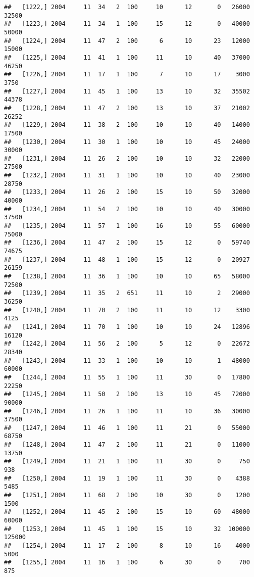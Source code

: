 \documentclass{article}\usepackage[]{graphicx}\usepackage[]{color}
\makeatletter
\newenvironment{kframe}{%
 \def\at@end@of@kframe{}%
 \ifinner\ifhmode%
  \def\at@end@of@kframe{\end{minipage}}%
  \begin{minipage}{\columnwidth}%
 \fi\fi%
 \def\FrameCommand##1{\hskip\@totalleftmargin \hskip-\fboxsep
 \colorbox{shadecolor}{##1}\hskip-\fboxsep
     \hskip-\linewidth \hskip-\@totalleftmargin \hskip\columnwidth}%
 \MakeFramed {\advance\hsize-\width
   \@totalleftmargin\z@ \linewidth\hsize
   \@setminipage}}%
 {\par\unskip\endMakeFramed%
 \at@end@of@kframe}
\newenvironment{knitrout}{}{} %
\makeatother
\begin{document}
\begin{knitrout}
\begin{kframe}
\begin{verbatim}
##   [1222,] 2004     11  34   2  100     10      12       0   26000   32500
##   [1223,] 2004     11  34   1  100     15      12       0   40000   50000
##   [1224,] 2004     11  47   2  100      6      10      23   12000   15000
##   [1225,] 2004     11  41   1  100     11      10      40   37000   46250
##   [1226,] 2004     11  17   1  100      7      10      17    3000    3750
##   [1227,] 2004     11  45   1  100     13      10      32   35502   44378
##   [1228,] 2004     11  47   2  100     13      10      37   21002   26252
##   [1229,] 2004     11  38   2  100     10      10      40   14000   17500
##   [1230,] 2004     11  30   1  100     10      10      45   24000   30000
##   [1231,] 2004     11  26   2  100     10      10      32   22000   27500
##   [1232,] 2004     11  31   1  100     10      10      40   23000   28750
##   [1233,] 2004     11  26   2  100     15      10      50   32000   40000
##   [1234,] 2004     11  54   2  100     10      10      40   30000   37500
##   [1235,] 2004     11  57   1  100     16      10      55   60000   75000
##   [1236,] 2004     11  47   2  100     15      12       0   59740   74675
##   [1237,] 2004     11  48   1  100     15      12       0   20927   26159
##   [1238,] 2004     11  36   1  100     10      10      65   58000   72500
##   [1239,] 2004     11  35   2  651     11      10       2   29000   36250
##   [1240,] 2004     11  70   2  100     11      10      12    3300    4125
##   [1241,] 2004     11  70   1  100     10      10      24   12896   16120
##   [1242,] 2004     11  56   2  100      5      12       0   22672   28340
##   [1243,] 2004     11  33   1  100     10      10       1   48000   60000
##   [1244,] 2004     11  55   1  100     11      30       0   17800   22250
##   [1245,] 2004     11  50   2  100     13      10      45   72000   90000
##   [1246,] 2004     11  26   1  100     11      10      36   30000   37500
##   [1247,] 2004     11  46   1  100     11      21       0   55000   68750
##   [1248,] 2004     11  47   2  100     11      21       0   11000   13750
##   [1249,] 2004     11  21   1  100     11      30       0     750     938
##   [1250,] 2004     11  19   1  100     11      30       0    4388    5485
##   [1251,] 2004     11  68   2  100     10      30       0    1200    1500
##   [1252,] 2004     11  45   2  100     15      10      60   48000   60000
##   [1253,] 2004     11  45   1  100     15      10      32  100000  125000
##   [1254,] 2004     11  17   2  100      8      10      16    4000    5000
##   [1255,] 2004     11  16   1  100      6      30       0     700     875

\end{verbatim}
\end{kframe}
\end{knitrout}
\end{document}
